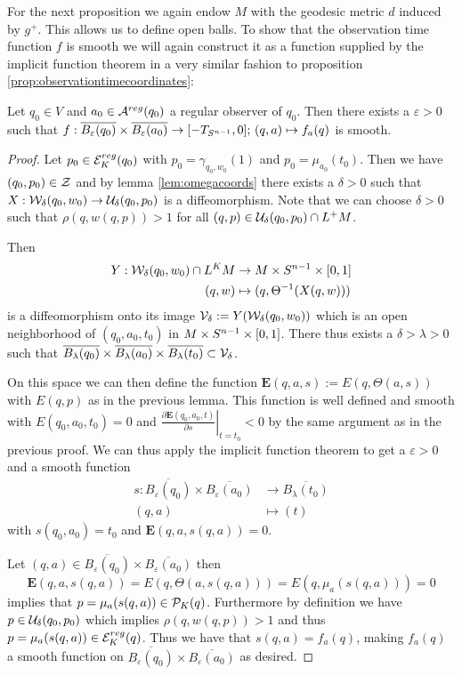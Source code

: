 For the next proposition we again endow $M$ with the geodesic metric $d$ induced by $g^+$. This allows us to define open balls. To show that the observation time function $f$ is smooth we will again construct it as a function supplied by
the implicit function theorem in a very similar fashion to proposition \ref{prop:observationtimecoordinates}:
\begin{proposition}\label{prop:fsmooth}
    Let $q_0\in V$ and $a_0\in {{\mathcal{A}}^{reg}}(q_0)$ a regular observer of $q_0$. Then there exists a $\varepsilon>0$ such that $f:\overline{B_\varepsilon(q_0)}\times \overline{B_\varepsilon(a_0)} \to [-T_{S^{n-1}},0]; \, (q,a)\mapsto f_a(q)$ is smooth.
\end{proposition}
\begin{proof}
    Let $p_0 \in {{\mathcal{E}}^{reg}_K}(q_0)$ with $p_0 = \gamma_{q_0,w_0}(1)$ and $p_0 = \mu_{a_0}(t_0)$. Then we have $(q_0,p_0)\in {\mathcal{Z}}$ and by lemma \ref{lem:omegacoords} there exists a $\delta>0$ such that $X:{\mathcal{W}}_\delta(q_0,w_0)\to {\mathcal{U}}_\delta(q_0,p_0)$ is a diffeomorphism. Note that we can choose $\delta>0$ such that $\rho(q,w(q,p))>1$ for all $(q,p)\in {\mathcal{U}}_\delta(q_0,p_0) \cap L^+M$.

    Then 
    \begin{align*}
        Y:{\mathcal{W}}_\delta(q_0,w_0) \cap L^KM&\to M\times {S^{n-1}} \times [0,1]\\
        (q,w) &\mapsto (q,\Theta^{-1}(X(q,w)))
    \end{align*} 
    is a diffeomorphism onto its image ${\mathcal{V}}_\delta:=Y({\mathcal{W}}_\delta(q_0,w_0))$  which is an open neighborhood of $(q_0,a_0,t_0)$ in $M\times {S^{n-1}} \times [0,1]$. There thus exists a $\delta > \lambda>0$ such that $\overline{B_\lambda(q_0)}\times\overline{B_\lambda(a_0)} \times\overline{B_\lambda(t_0)} \subset {\mathcal{V}}_\delta$.

    On this space we can then define the function $\mathbf{E}(q,a,s):=E(q,\Theta(a,s))$ with $E(q,p)$ as in the previous lemma. This function is well defined and smooth with $E(q_0,a_0,t_0)=0$ and $\left.\frac{\partial\mathbf{E}(q_0,a_0,t)}{\partial s}\right\rvert_{t=t_0} < 0$ by the same argument as in the previous proof. We can thus apply the implicit function theorem to get a $\varepsilon>0$ and a smooth function 
    \begin{align*}
        s:\overline{B_\varepsilon(q_0)}\times\overline{B_\varepsilon(a_0)} &\to \overline{B_\lambda(t_0)}\\
        (q,a)&\mapsto (t)
    \end{align*} with $s(q_0,a_0)=t_0$ and $\mathbf{E}(q,a,s(q,a))=0$.

    Let $(q,a) \in \overline{B_\varepsilon(q_0)}\times\overline{B_\varepsilon(a_0)}$ then 
    \[
        \mathbf{E}(q,a,s(q,a))=E(q,\Theta(a,s(q,a))) = E(q,\mu_a(s(q,a))) = 0
    \] 
    implies that $p=\mu_a(s(q,a))\in {\mathcal{P}}_K(q)$. Furthermore by definition we have $p\in {\mathcal{U}}_\delta(q_0,p_0)$ which implies $\rho(q,w(q,p))>1$ and thus $p=\mu_a(s(q,a))\in {{\mathcal{E}}^{reg}_K}(q)$. Thus we have that $s(q,a)=f_a(q)$, making $f_a(q)$ a smooth function on $\overline{B_\varepsilon(q_0)}\times\overline{B_\varepsilon(a_0)}$ as desired.
\end{proof} 
